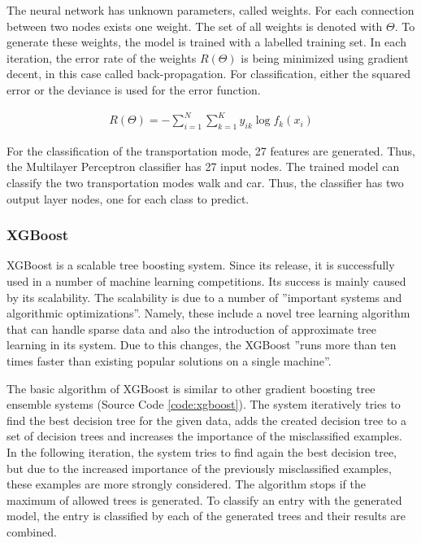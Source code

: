 The neural network has unknown parameters, called weights. For each connection between two nodes exists one weight. The set of all weights is denoted with $\Theta$. To generate these weights, the model is trained with a labelled training set. In each iteration, the error rate of the weights $R(\Theta)$ is being minimized using gradient decent, in this case called back-propagation. For classification, either the squared error or the deviance is used for the error function. \cite{hastie2005elements}

\begin{align}
    R(\Theta)=-\sum_{i=1}^N\sum_{k=1}^K y_{ik} \log f_k(x_i)
\end{align}{}

For the classification of the transportation mode, 27 features are generated. Thus, the Multilayer Perceptron classifier has 27 input nodes. The trained model can classify the two transportation modes walk and car. Thus, the classifier has two output layer nodes, one for each class to predict. 


\subsubsection{XGBoost}
XGBoost is a scalable tree boosting system. Since its release, it is successfully used in a number of machine learning competitions. Its success is mainly caused by its scalability. The scalability is due to a number of ''important systems and algorithmic optimizations''. Namely, these include a novel tree learning algorithm that can handle sparse data and also the introduction of approximate tree learning in its system. Due to this changes, the XGBoost ''runs more than ten times faster than existing popular solutions on a single machine''.  \cite{chen2016xgboost}

The basic algorithm of XGBoost is similar to other gradient boosting tree ensemble systems (Source Code \ref{code:xgboost}). The system iteratively tries to find the best decision tree for the given data, adds the created decision tree to a set of decision trees and increases the importance of the misclassified examples. In the following iteration, the system tries to find again the best decision tree, but due to the increased importance of the previously misclassified examples, these examples are more strongly considered. The algorithm stops if the maximum of allowed trees is generated. To classify an entry with the generated model, the entry is classified by each of the generated trees and their results are combined. \cite{chen2016xgboost}

